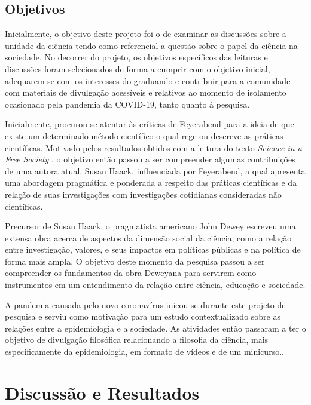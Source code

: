 \documentclass[12pt]{report}
\begin{document}
		\section*{Objetivos}
			Inicialmente, o objetivo deste projeto foi o de examinar as discussões sobre a unidade da ciência tendo como referencial a questão sobre o papel da ciência na sociedade.
			No decorrer do projeto, os objetivos específicos das leituras e discussões foram selecionados de forma a cumprir com o objetivo inicial, adequarem-se com os interesses do graduando e contribuir para a comunidade com materiais de divulgação acessíveis e relativos ao momento de isolamento ocasionado pela pandemia da COVID-19, tanto quanto à pesquisa.
			
			Inicialmente, procurou-se atentar às críticas de Feyerabend para a ideia de que existe um determinado método científico o qual rege ou descreve as práticas científicas.
			Motivado pelos resultados obtidos com a leitura do texto \textit{Science in a Free Society} \cite{feyerabend-science-free-society}, o objetivo então passou a ser compreender algumas contribuições de uma autora atual, Susan Haack, influenciada por Feyerabend, a qual apresenta uma abordagem pragmática e ponderada a respeito das práticas científicas e da relação de suas investigações com investigações cotidianas consideradas não científicas.
			
			Precursor de Susan Haack, o pragmatista americano John Dewey escreveu uma extensa obra acerca de aspectos da dimensão social da ciência, como a relação entre investigação, valores, e seus impactos em políticas públicas e na política de forma mais ampla. O objetivo deste momento da pesquisa passou a ser compreender os fundamentos da obra Deweyana para servirem como instrumentos em um entendimento da relação entre ciência, educação e sociedade.
			
			A pandemia causada pelo novo coronavírus inicou-se durante este projeto de pesquisa e serviu como motivação para um estudo contextualizado sobre as relações entre a epidemiologia e a sociedade. As atividades então passaram a ter o objetivo de divulgação filosófica relacionando a filosofia da ciência, mais especificamente da epidemiologia, em formato de vídeos e de um minicurso..
	
	
	\vspace*{-0.6cm}
	\chapter*{Discussão e Resultados}
	\vspace*{-0.75cm}
	
\end{document}
